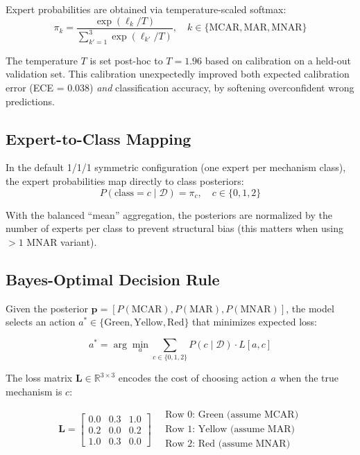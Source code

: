 \documentclass[11pt]{article}
\newcommand{\RR}{\mathbb{R}}
\begin{document}
Expert probabilities are obtained via temperature-scaled softmax:
\begin{equation}
\pi_k = \frac{\exp(\ell_k / T)}{\sum_{k'=1}^{3} \exp(\ell_{k'} / T)}, \quad k \in \{\text{MCAR}, \text{MAR}, \text{MNAR}\}
\label{eq:temp_softmax}
\end{equation}

The temperature $T$ is set post-hoc to $T = 1.96$ based on calibration on a held-out validation set. This calibration unexpectedly improved both expected calibration error (ECE = 0.038) \emph{and} classification accuracy, by softening overconfident wrong predictions.

\subsection{Expert-to-Class Mapping}

In the default 1/1/1 symmetric configuration (one expert per mechanism class), the expert probabilities map directly to class posteriors:
\begin{equation}
P(\text{class} = c \mid \mathcal{D}) = \pi_c, \quad c \in \{0, 1, 2\}
\label{eq:class_posterior}
\end{equation}

With the balanced ``mean'' aggregation, the posteriors are normalized by the number of experts per class to prevent structural bias (this matters when using $>1$ MNAR variant).

\subsection{Bayes-Optimal Decision Rule}

Given the posterior $\mathbf{p} = [P(\text{MCAR}), P(\text{MAR}), P(\text{MNAR})]$, the model selects an action $a^* \in \{\text{Green}, \text{Yellow}, \text{Red}\}$ that minimizes expected loss:

\begin{equation}
a^* = \arg\min_{a} \sum_{c \in \{0,1,2\}} P(c \mid \mathcal{D}) \cdot L[a, c]
\label{eq:bayes_decision}
\end{equation}

The loss matrix $\mathbf{L} \in \RR^{3 \times 3}$ encodes the cost of choosing action $a$ when the true mechanism is $c$:

\begin{equation}
\mathbf{L} = \begin{bmatrix}
0.0 & 0.3 & 1.0 \\
0.2 & 0.0 & 0.2 \\
1.0 & 0.3 & 0.0
\end{bmatrix}
\quad
\begin{array}{l}
\text{Row 0: Green (assume MCAR)} \\
\text{Row 1: Yellow (assume MAR)} \\
\text{Row 2: Red (assume MNAR)}
\end{array}
\label{eq:loss_matrix}
\end{equation}
\end{document}
